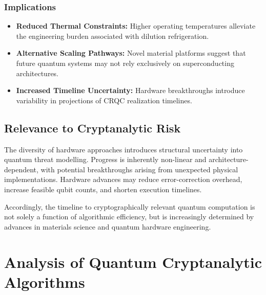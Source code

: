 \documentclass[11pt,a4paper]{article}
\begin{document}
\subsubsection{Implications}

\begin{itemize}
    \item \textbf{Reduced Thermal Constraints:} Higher operating temperatures alleviate the engineering burden associated with dilution refrigeration.
    \item \textbf{Alternative Scaling Pathways:} Novel material platforms suggest that future quantum systems may not rely exclusively on superconducting architectures.
    \item \textbf{Increased Timeline Uncertainty:} Hardware breakthroughs introduce variability in projections of CRQC realization timelines.
\end{itemize}

\subsection{Relevance to Cryptanalytic Risk}

The diversity of hardware approaches introduces structural uncertainty into quantum threat modelling. Progress is inherently non-linear and architecture-dependent, with potential breakthroughs arising from unexpected physical implementations. Hardware advances may reduce error-correction overhead, increase feasible qubit counts, and shorten execution timelines.

Accordingly, the timeline to cryptographically relevant quantum computation is not solely a function of algorithmic efficiency, but is increasingly determined by advances in materials science and quantum hardware engineering.

\section{Analysis of Quantum Cryptanalytic Algorithms}
\end{document}
